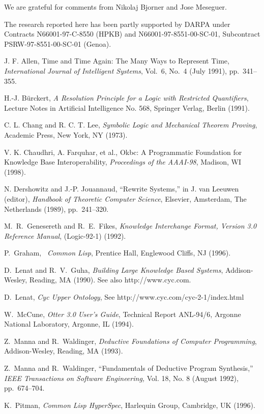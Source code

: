 We are grateful for comments from Nikolaj Bjorner and Jose Meseguer.

The research reported here has been partly supported by DARPA under Contracts
N66001-97-C-8550 (HPKB) and N66001-97-8551-00-SC-01, Subcontract
PSRW-97-8551-00-SC-01 (Genoa).
\newpage
\label{bibliography}
\begin{thebibliography}{Chang and Lee}

  J. F. Allen, Time and Time Again:  The Many Ways
 to Represent Time, {\em International Journal of Intelligent Systems},
 Vol.\ 6, No.\ 4 (July 1991), pp.\ 341--355.

  H.-J. B\"urckert, {\em
A Resolution Principle for a Logic with Restricted Quantifiers},
Lecture Notes in Artificial Intelligence No. 568, Springer Verlag,
Berlin (1991).


  C. L. Chang and R. C. T. Lee, {\em
 Symbolic Logic and Mechanical Theorem Proving}, Academic Press, New
 York, NY (1973).

  V. K. Chaudhri, A. Farquhar, et al., {\sc
 Okbc}: A Programmatic Foundation for Knowledge Base Interoperability,
  {\em Proceedings of the AAAI-98}, Madison, WI (1998).

 N. Dershowitz and
J.-P. Jouannaud, ``Rewrite Systems,'' in J. van Leeuwen (editor), {\em Handbook
of Theoretic Computer Science}, Elsevier, Amsterdam, The Netherlands
(1989), pp.\ 241--320.

 M.\  R.\  Genesereth and R.\  E.\  Fikes, {\em Knowledge
Interchange Format, Version 3.0 Reference Manual}, (Logic-92-1) (1992).

  P.\  Graham, {\em \ansi\   Common Lisp},
 Prentice Hall, Englewood Cliffs, NJ (1996).

  D.\  Lenat and R.\  V.\  Guha, {\em Building Large
  Knowledge Based Systems},  Addison-Wesley, Reading, MA (1990).  See also
  {http://www.cyc.com}.

  D.\  Lenat, {\em Cyc Upper Ontology},
  See %
  {http://www.cyc.com/cyc-2-1/index.html}


  W.\   McCune, {\em Otter 3.0 User's Guide},
 Technical Report ANL-94/6, Argonne National Laboratory, Argonne, IL
 (1994).

  Z.\   Manna and R.\   Waldinger, {\em
 Deductive Foundations of Computer Programming}, Addison-Wesley,
 Reading, MA (1993).

  Z.\   Manna and R.\   Waldinger,
 ``Fundamentals of Deductive Program Synthesis,'' {\em IEEE
 Transactions on Software Engineering,} Vol. 18, No. 8 (August 1992),
 pp.\  674--704.

  K.\   Pitman, {\em Common Lisp
 HyperSpec}, Harlequin Group, Cambridge, UK (1996).

\end{thebibliography}



